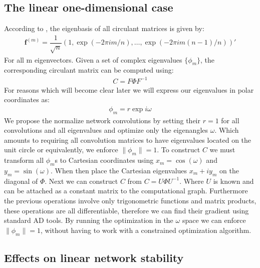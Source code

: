 \documentclass{article}
\begin{document}
\subsection{The linear one-dimensional case}
According to \cite[page 33]{gray}, the eigenbasis of all circulant matrices is given by:
\begin{align}
\mathbf{f}^{(m)} = \dfrac{1}{\sqrt{n}}(1, \exp(-2\pi im/n), \dots, \exp(-2\pi im(n-1)/n))'
\end{align}
For all m eigenvectors. Given a set of complex eigenvalues $\{\phi_m\}$, the corresponding
circulant matrix can be computed using:
\begin{align}
C = F \Phi F^{-1}
\end{align}
For reasons which will become clear later we will express our eigenvalues in polar coordinates
as:
\begin{align}
\phi_m = r \exp{i\omega}
\end{align}
We propose the normalize network convolutions by setting their $r=1$ for all convolutions and all eigenvalues and optimize only the eigenangles $\omega$. Which amounts to requiring all
convolution matrices to have eigenvalues located on the unit circle or equivalently, we enforce 
$\| \phi_m \| = 1$. To construct $C$ we must transform all $\phi_m$s to Cartesian coordinates 
using $x_m= \cos(\omega)$ and $y_m=\sin(\omega)$. When then place the Cartesian eigenvalues $x_m + iy_m$ on the diagonal of $\Phi$. Next we can construct $C$ from $C = U \Phi U^{-1}$. Where $U$ is known and can be attached as a constant matrix to the computational graph. Furthermore the previous operations involve only trigonometric functions and matrix products, these operations are all differentiable, therefore we can find their gradient using standard AD tools.
By running the optimization in the $\omega$ space we can enforce $\| \phi_m \| = 1$, without having to work with a constrained optimization algorithm.

\subsection{Effects on linear network stability}
\end{document}
